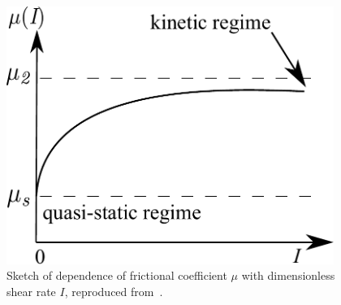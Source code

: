 \begin{figure}[tbhp]
\centering
\includegraphics[width=0.95\textwidth]{mu}
\caption[Dependence of frictional coefficient $\mu$ with dimensionless shear 
rate $\textit{I}$.]{Sketch of dependence of frictional coefficient $\mu$ with 
dimensionless shear rate $\textit{I}$, reproduced from~\citet{Pouliquen2006}.}
\label{fig:mu}
\end{figure}


